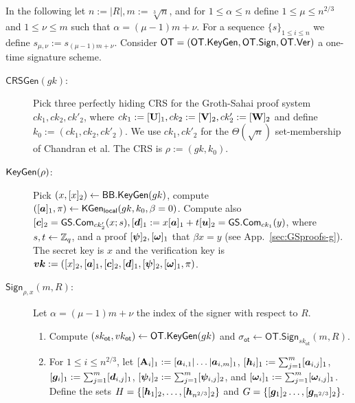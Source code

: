 
In the following let $n:=|R|, m:=\sqrt[3]{n}$, and for $1\leq \alpha\leq n$ define $1\leq \mu \leq n^{2/3}$ and $1\leq \nu\leq m$ such that $\alpha=(\mu-1)m+\nu$. For a sequence $\{s\}_{1\leq i\leq n}$ we define $s_{\mu,\nu}:=s_{(\mu-1)m+\nu}$. Consider $\mathsf{OT}=(\mathsf{OT}.\mathsf{KeyGen},\mathsf{OT}.\mathsf{Sign},\allowbreak\mathsf{OT}.\mathsf{Ver})$ a one-time signature scheme.

\begin{description}
\item[$\mathsf{CRSGen}(gk)$:] Pick three perfectly hiding CRS for the Groth-Sahai proof system $ck_1,ck_2,ck'_2$, where $ck_1 := [\mathbf{{U}}]_1,ck_2 :=[\mathbf{{V}}]_2,ck'_2:=[\mathbf{{W}}]_2$ and define $k_0 := (ck_1,ck_2,ck'_2)$. We use $ck_1,ck'_2$ for the $\Theta(\sqrt{n})$ set-membership of Chandran et al. The CRS is $\rho:=(gk,k_0).$

\item[$\mathsf{KeyGen}(\rho)$:] Pick $(x,[x]_2)\gets\mathsf{BB}.\mathsf{KeyGen}(gk)$, compute $([{\boldsymbol{a}}]_1,\pi)\allowbreak\gets\mathsf{KGen}_{\mathsf{local}}(gk,k_0,\beta = 0)$. Compute also $[{\boldsymbol{c}}]_2 = {\mathsf{GS}}.\mathsf{Com}_{ck'_2}(x;s),[{\boldsymbol{d}}]_1 :=x[{\boldsymbol{a}}]_1+t[{\boldsymbol{u}}]_2 = {\mathsf{GS}}.\mathsf{Com}_{ck_1}(y)$, where $s,t\gets\mathbb{Z}_q$, and a proof $[{\boldsymbol{\psi}}]_2,[{\boldsymbol{\omega}}]_1$ that $\beta x = y$ (see App.~\ref{sec:GSproofs-g}). The secret key is $x$ and the verification key is ${\boldsymbol{vk}}:=([x]_2,[{\boldsymbol{a}}]_1,[{\boldsymbol{c}}]_2,[{\boldsymbol{d}}]_1,[{\boldsymbol{\psi}}]_2,[{\boldsymbol{\omega}}]_1,\pi)$.

\item[$\mathsf{Sign}_{\rho,x}(m,R)$:] Let $\alpha=(\mu-1)m+\nu$ the index of the signer with respect to $R$.
\begin{enumerate}
\item Compute $(sk_\mathsf{ot},vk_\mathsf{ot})\gets\mathsf{OT}.\mathsf{KeyGen}(gk)$ and $\sigma_\mathsf{ot}\gets\allowbreak\mathsf{OT}.\allowbreak\mathsf{Sign}_{sk_\mathsf{ot}}(m,R)$.

\item For $1\leq i \leq n^{2/3}$, let $[\mathbf{{A}}_i]_1:=[{\boldsymbol{a}}_{i,1}|\allowbreak\ldots|\allowbreak{\boldsymbol{a}}_{i,m}]_1$, $[{\boldsymbol{h}}_i]_1 := \sum_{j=1}^m[{\boldsymbol{a}}_{i,j}]_1$, $[{\boldsymbol{g}}_i]_1:=\sum_{j=1}^{m}[{\boldsymbol{d}}_{i,j}]_1$, $[{\boldsymbol{\psi}}_i]_2 :=\sum_{j=1}^m [{\boldsymbol{\psi}}_{i,j}]_2$, and $[{\boldsymbol{\omega}}_i]_1:=\sum_{j=1}^m[{\boldsymbol{\omega}}_{i,j}]_1$. Define the sets
$H=\{[{\boldsymbol{h}}_1]_2,\ldots,[{\boldsymbol{h}}_{n^{2/3}}]_2\}$ and
$G=\{
	[{\boldsymbol{g}}_1]_2
	\allowbreak\ldots,\allowbreak
	[{\boldsymbol{g}}_{n^{2/3}}]_2\}$.


\end{enumerate}
\end{description}
